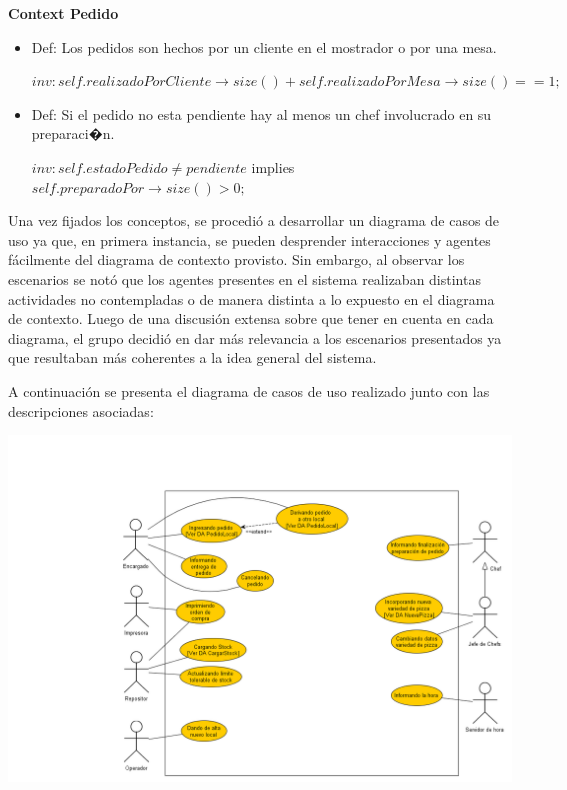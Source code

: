 \documentclass[a4paper,11pt] {article}
\begin{document}
\textbf{Context Pedido}

\begin{itemize}
	\item Def: Los pedidos son hechos por un cliente en el mostrador o por una mesa.
	
	$inv: self.realizadoPorCliente\rightarrow size() + self.realizadoPorMesa\rightarrow size() == 1;$
	
	\item Def: Si el pedido no esta pendiente hay al menos un chef involucrado en su preparaci�n.
	
	$inv: self.estadoPedido \neq pendiente$ implies $self.preparadoPor\rightarrow size() > 0;$
\end{itemize}


\bigskip

Una vez fijados los conceptos, se procedi\'o a desarrollar un diagrama de casos de uso ya que, en primera instancia, se pueden desprender interacciones y agentes f\'acilmente del diagrama de contexto provisto. Sin embargo, al observar los escenarios se not\'o que los agentes presentes en el sistema realizaban distintas actividades no contempladas o de manera distinta a lo expuesto en el diagrama de contexto. Luego de una discusi\'on extensa sobre que tener en cuenta en cada diagrama, el grupo decidi\'o en dar m\'as relevancia a los escenarios presentados ya que resultaban m\'as coherentes a la idea general del sistema.

A continuaci\'on se presenta el diagrama de casos de uso realizado junto con las descripciones asociadas:

\begin{center}
 \includegraphics[width=1\textwidth]{Diagramas/CasosDeUso.png}
\end{center}
\end{document}
